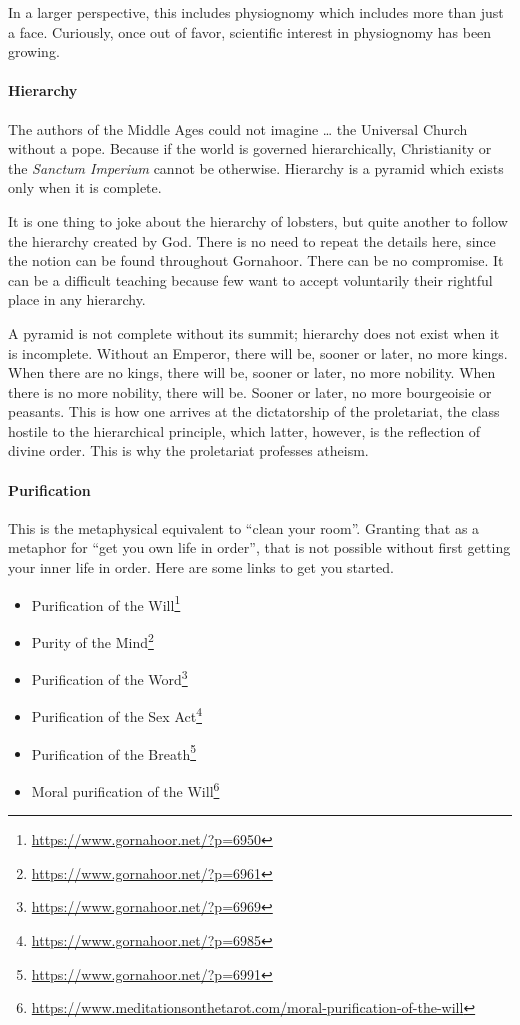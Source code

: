 In a larger perspective, this includes physiognomy which includes more than just a face. Curiously, once out of favor, scientific interest in physiognomy has been growing.

\paragraph{Hierarchy}
\begin{quotex}
The authors of the Middle Ages could not imagine … the Universal Church without a pope. Because if the world is governed hierarchically, Christianity or the \emph{Sanctum Imperium} cannot be otherwise. Hierarchy is a pyramid which exists only when it is complete. 

\end{quotex}
It is one thing to joke about the hierarchy of lobsters, but quite another to follow the hierarchy created by God. There is no need to repeat the details here, since the notion can be found throughout Gornahoor. There can be no compromise. It can be a difficult teaching because few want to accept voluntarily their rightful place in any hierarchy.

\begin{quotex}
A pyramid is not complete without its summit; hierarchy does not exist when it is incomplete. Without an Emperor, there will be, sooner or later, no more kings. When there are no kings, there will be, sooner or later, no more nobility. When there is no more nobility, there will be. Sooner or later, no more bourgeoisie or peasants. This is how one arrives at the dictatorship of the proletariat, the class hostile to the hierarchical principle, which latter, however, is the reflection of divine order. This is why the proletariat professes atheism. 

\end{quotex}
\paragraph{Purification}
This is the metaphysical equivalent to “clean your room”. Granting that as a metaphor for “get you own life in order”, that is not possible without first getting your inner life in order. Here are some links to get you started.

\begin{itemize}
\item Purification of the Will\footnote{\url{https://www.gornahoor.net/?p=6950}}
\item Purity of the Mind\footnote{\url{https://www.gornahoor.net/?p=6961}}
\item Purification of the Word\footnote{\url{https://www.gornahoor.net/?p=6969}}
\item Purification of the Sex Act\footnote{\url{https://www.gornahoor.net/?p=6985}}
\item Purification of the Breath\footnote{\url{https://www.gornahoor.net/?p=6991}}
\item Moral purification of the Will\footnote{\url{https://www.meditationsonthetarot.com/moral-purification-of-the-will}}
\end{itemize}
